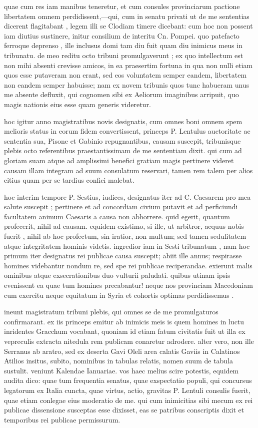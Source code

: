  quae cum res iam manibus teneretur, et cum consules provinciarum pactione libertatem omnem perdidissent,—qui, cum in senatu privati ut de me sententias dicerent flagitabant , legem illi se Clodiam timere dicebant: cum hoc non possent iam diutius sustinere, initur consilium de interitu Cn. Pompei. quo patefacto ferroque deprenso , ille inclusus domi tam diu fuit quam diu inimicus meus in tribunatu. de meo reditu octo tribuni promulgaverunt ; ex quo intellectum est non mihi absenti crevisse amicos, in ea praesertim fortuna in qua non nulli etiam quos esse putaveram non erant, sed eos voluntatem semper eandem, libertatem non eandem semper habuisse; nam ex novem tribunis quos tunc habueram unus me absente defluxit, qui cognomen sibi ex Aeliorum imaginibus arripuit, quo magis nationis eius esse quam generis videretur.

 hoc igitur anno magistratibus novis designatis, cum omnes boni omnem spem melioris status in eorum fidem convertissent, princeps P. Lentulus auctoritate ac sententia sua, Pisone et Gabinio repugnantibus, causam suscepit, tribunisque plebis octo referentibus praestantissimam de me sententiam dixit. qui cum ad gloriam suam atque ad amplissimi benefici gratiam magis pertinere videret causam illam integram ad suum consulatum reservari, tamen rem talem per alios citius quam per se tardius confici malebat.

 hoc interim tempore P. Sestius, iudices, designatus iter ad C. Caesarem pro mea salute suscepit ; pertinere et ad concordiam civium putavit et ad perficiundi facultatem animum Caesaris a causa non abhorrere. quid egerit, quantum profecerit, nihil ad causam. equidem existimo, si ille, ut arbitror, aequus nobis fuerit , nihil ab hoc profectum, sin iratior, non multum; sed tamen sedulitatem atque integritatem hominis videtis. ingredior iam in Sesti tribunatum , nam hoc primum iter designatus rei publicae causa suscepit; abiit ille annus; respirasse homines videbantur nondum re, sed spe rei publicae reciperandae. exierunt malis ominibus atque exsecrationibus duo vulturii paludati. quibus utinam ipsis evenissent ea quae tum homines precabantur! neque nos provinciam Macedoniam cum exercitu neque equitatum in Syria et cohortis optimas perdidissemus .

 ineunt magistratum tribuni plebis, qui omnes se de me promulgaturos confirmarant. ex iis princeps emitur ab inimicis meis is quem homines in luctu inridentes Gracchum vocabant, quoniam id etiam fatum civitatis fuit ut illa ex vepreculis extracta nitedula rem publicam conaretur adrodere. alter vero, non ille Serranus ab aratro, sed ex deserta Gavi Oleli area calatis Gaviis in Calatinos Atilios insitus, subito, nominibus in tabulas relatis, nomen suum de tabula sustulit. veniunt Kalendae Ianuariae. vos haec melius scire potestis, equidem audita dico: quae tum frequentia senatus, quae exspectatio populi, qui concursus legatorum ex Italia cuncta, quae virtus, actio, gravitas P. Lentuli consulis fuerit, quae etiam conlegae eius moderatio de me. qui cum inimicitias sibi mecum ex rei publicae dissensione susceptas esse dixisset, eas se patribus conscriptis dixit et temporibus rei publicae permissurum.

